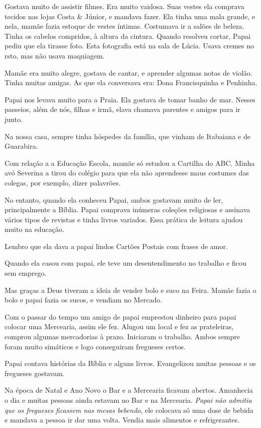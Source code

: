 \documentclass[
  brazil,
  a6paper,
  oneside,
  landscape,
  14pt]{scrbook}
\begin{document}
Gostava muito de assistir filmes. Era muito vaidosa. Suas vestes ela
comprava tecidos nas lojas Costa \& Júnior, e mandava fazer. Ela tinha
uma mala grande, e nela, mamãe fazia estoque de vestes íntimas.
Costumava ir a salões de beleza. Tinha os cabelos compridos, à altura da
cintura. Quando resolveu cortar, Papai pediu que ela tirasse foto. Esta
fotografia está na sala de Lúcia. Usava cremes no rsto, mas não usava
maquiagem.

Mamãe era muito alegre, gostava de cantar, e aprender algumas notas de
violão. Tinha muitas amigas. As que ela conversava era: Dona
Francisquinha e Penhinha.

Papai nos levava muito para a Praia. Ela gostava de tomar banho de mar.
Nesses passeios, além de nós, filhas e irmã, elava chamava parentes e
amigos para ir junto.

Na nossa casa, sempre tinha hóspedes da família, que vinham de Itabaiana
e de Guarabira.

Com relação a a Educação Escola, mamãe só estudou a Cartilha do ABC.
Minha avó Severina a tirou do colégio para que ela não aprendesse maus
costumes das colegas, por exemplo, dizer palavrões.

No entanto, quando ela conheceu Papai, ambos gostavam muito de ler,
principalmente a Bíblia. Papai comprava inúmeras coleções religiosas e
assinava vários tipos de revistas e tinha livros variados. Essa prática
de leitura ajudou muito na educação.

Lembro que ela dava a papai lindos Cartões Postais com frases de amor.

Quando ela casou com papai, ele teve um desentendimento no trabalho e
ficou sem emprego.

Mas graças a Deus tiveram a ideia de vender bolo e suco na Feira. Mamãe
fazia o bolo e papai fazia os sucos, e vendiam no Mercado.

Com o passar do tempo um amigo de papai emprestou dinheiro para papai
colocar uma Mercearia, assim ele fez. Alugou um local e fez as
prateleiras, comprou algumas mercadorias à prazo. Iniciaram o trabalho.
Ambos sempre foram muito simáticos e logo conseguiram fregueses certos.

Papai contava histórias da Bíblia e alguns livros. Evangelizou muitas
pessoas e os fregueses gostavam.

Na época de Natal e Ano Novo o Bar e a Mercearia ficavam abertos.
Amanhecia o dia e muitas pessoas ainda estavam no Bar e na Mercearia.
\emph{Papai não admitia que os fregueses ficassem nas mesas bebendo},
ele colocava só uma dose de bebida e mandava a pessoa ir dar uma volta.
Vendia mais alimentos e refrigerantes.
\end{document}
